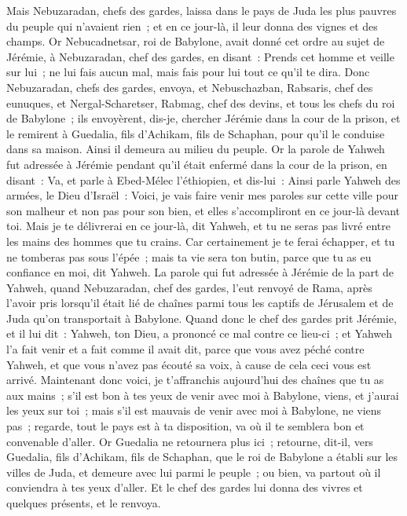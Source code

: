 \begin{multicols}{2}
Mais Nebuzaradan, chefs des gardes, laissa dans le pays de Juda les plus pauvres du peuple qui n'avaient rien~; et en ce jour-là, il leur donna des vignes et des champs.
Or Nebucadnetsar, roi de Babylone, avait donné cet ordre au sujet de Jérémie, à Nebuzaradan, chef des gardes, en disant~:
Prends cet homme et veille sur lui~; ne lui fais aucun mal, mais fais pour lui tout ce qu'il te dira.
Donc Nebuzaradan, chefs des gardes, envoya, et Nebuschazban, Rabsaris, chef des eunuques, et Nergal-Scharetser, Rabmag, chef des devins, et tous les chefs du roi de Babylone~;
ils envoyèrent, dis-je, chercher Jérémie dans la cour de la prison, et le remirent à Guedalia, fils d'Achikam, fils de Schaphan, pour qu'il le conduise dans sa maison. Ainsi il demeura au milieu du peuple.
Or la parole de Yahweh fut adressée à Jérémie pendant qu'il était enfermé dans la cour de la prison, en disant~:
Va, et parle à Ebed-Mélec l'éthiopien, et dis-lui~: Ainsi parle Yahweh des armées, le Dieu d'Israël~: Voici, je vais faire venir mes paroles sur cette ville pour son malheur et non pas pour son bien, et elles s'accompliront en ce jour-là devant toi.
Mais je te délivrerai en ce jour-là, dit Yahweh, et tu ne seras pas livré entre les mains des hommes que tu crains.
Car certainement je te ferai échapper, et tu ne tomberas pas sous l'épée~; mais ta vie sera ton butin, parce que tu as eu confiance en moi, dit Yahweh.
\VerseOne{}La parole qui fut adressée à Jérémie de la part de Yahweh, quand Nebuzaradan, chef des gardes, l'eut renvoyé de Rama, après l'avoir pris lorsqu'il était lié de chaînes parmi tous les captifs de Jérusalem et de Juda qu'on transportait à Babylone.
Quand donc le chef des gardes prit Jérémie, et il lui dit~: Yahweh, ton Dieu, a prononcé ce mal contre ce lieu-ci~;
et Yahweh l'a fait venir et a fait comme il avait dit, parce que vous avez péché contre Yahweh, et que vous n'avez pas écouté sa voix, à cause de cela ceci vous est arrivé.
Maintenant donc voici, je t'affranchis aujourd'hui des chaînes que tu as aux mains~; s'il est bon à tes yeux de venir avec moi à Babylone, viens, et j'aurai les yeux sur toi~; mais s'il est mauvais de venir avec moi à Babylone, ne viens pas~; regarde, tout le pays est à ta disposition, va où il te semblera bon et convenable d'aller.
Or Guedalia ne retournera plus ici~; retourne, dit-il, vers Guedalia, fils d'Achikam, fils de Schaphan, que le roi de Babylone a établi sur les villes de Juda, et demeure avec lui parmi le peuple~; ou bien, va partout où il conviendra à tes yeux d'aller. Et le chef des gardes lui donna des vivres et quelques présents, et le renvoya.

\end{multicols}
